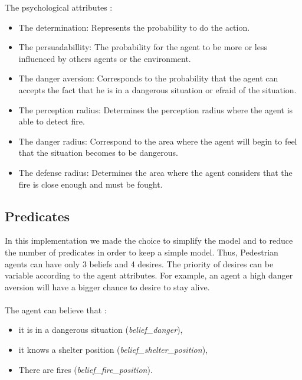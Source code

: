 \documentclass[12pt, a4paper]{memoir} %
\begin{document}
			The psychological attributes :
			\begin{itemize}
				\item The determination: Represents the probability to do the action.
				\item The persuadabillity: The probability for the agent to be more or less influenced by others agents or the environment.
				\item The danger aversion: Corresponds to the probability that the agent can accepts the fact that he is in a dangerous situation
				or efraid of the situation.
				\item The perception radius: Determines the perception radius where the agent is able to detect fire.
				\item The danger radius: Correspond to the area where the agent will begin to feel that the situation becomes to be dangerous.
				\item The defense radius: Determines the area where the agent considers that the fire is close enough and must be fought.
			\end{itemize}

		\subsection{Predicates}

			In this implementation we made the choice to simplify the model and to reduce the number of predicates in order to keep a simple model.
			Thus, Pedestrian agents can have only 3 beliefs and 4 desires. The priority of desires can be variable according to the agent attributes. For example,
			an agent a high danger aversion will have a bigger chance to desire to stay alive.

			\paragraph{}
			The agent can believe that :
			\begin{itemize}
				\item it is in a dangerous situation (\textit{belief\_danger}),
				\item it knows a shelter position (\textit{belief\_shelter\_position}),
				\item There are fires (\textit{belief\_fire\_position}).
			\end{itemize}
\end{document}
